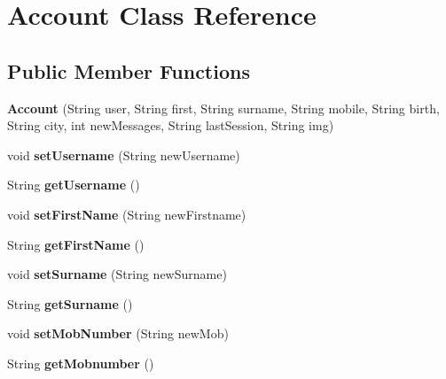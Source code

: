 \hypertarget{class_account}{}\section{Account Class Reference}
\label{class_account}
\subsection*{Public Member Functions}
\begin{DoxyCompactItemize}
\item 
\mbox{\label{class_account_a87f6c274e731792f3afb7d84179348f2}} 
{\bfseries Account} (String user, String first, String surname, String mobile, String birth, String city, int new\+Messages, String last\+Session, String img)
\item 
\mbox{\label{class_account_aeb1a344ab7a43a65ed1e2327e3016e22}} 
void {\bfseries set\+Username} (String new\+Username)
\item 
\mbox{\label{class_account_a9c231a2bbfa763ee161917582be7ca93}} 
String {\bfseries get\+Username} ()
\item 
\mbox{\label{class_account_a1dbd2d481b5a3bf8016c620bb0546285}} 
void {\bfseries set\+First\+Name} (String new\+Firstname)
\item 
\mbox{\label{class_account_a2fbf24827ade2497429bbd0bd3b92f3b}} 
String {\bfseries get\+First\+Name} ()
\item 
\mbox{\label{class_account_a7a1f746590e16a91a05219190dffb6e9}} 
void {\bfseries set\+Surname} (String new\+Surname)
\item 
\mbox{\label{class_account_aad97893bafd1f37bd90b91dbd733a7b4}} 
String {\bfseries get\+Surname} ()
\item 
\mbox{\label{class_account_adc524e66e05cbaf086540011af3a9416}} 
void {\bfseries set\+Mob\+Number} (String new\+Mob)
\item 
\mbox{\label{class_account_a2af06a20ff55e26e1df6a2c138eec752}} 
String {\bfseries get\+Mobnumber} ()

\end{DoxyCompactItemize}
